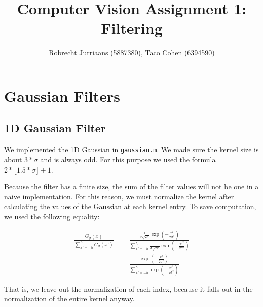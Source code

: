 \documentclass[a4paper,10pt]{article}
\title{Computer Vision Assignment 1: Filtering}
\author{Robrecht Jurriaans (5887380), Taco Cohen (6394590)}
\begin{document}
\maketitle

\section{Gaussian Filters}

\subsection{1D Gaussian Filter}
We implemented the 1D Gaussian in \verb+gaussian.m+.
We made sure the kernel size is about $3*\sigma$ and is always odd.
For this purpose we used the formula $2 * \lfloor 1.5 * \sigma \rfloor + 1$.

Because the filter has a finite size, the sum of the filter values will not be one in a naive implementation.
For this reason, we must normalize the kernel after calculating the values of the Gaussian at each kernel entry.
To save computation, we used the following equality:

\begin{align*}
 \frac{G_{\sigma}(x)}{\sum_{x'=-h}^h G_{\sigma}(x')} &= \frac{ \frac{1}{\sigma \sqrt{2 \pi}} \exp(-\frac{x^2}{2 \sigma^2})}
       {\sum_{x'=-h}^h \frac{1}{\sigma \sqrt{2 \pi}} \exp(-\frac{x'^2}{2 \sigma^2})} \\
&= \frac{ \exp(-\frac{x^2}{2 \sigma^2})}
       {\sum_{x'=-h}^h \exp(-\frac{x'^2}{2 \sigma^2})}
\end{align*}

That is, we leave out the normalization of each index, because it falls out in the normalization of the entire kernel anyway.

\subsection{}
\end{document}
